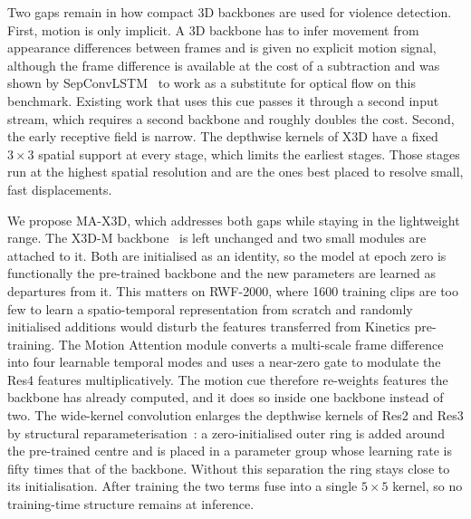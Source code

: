 \documentclass[conference]{IEEEtran}
\begin{document}
Two gaps remain in how compact 3D backbones are used for violence
detection. First, motion is only implicit. A 3D backbone has to infer
movement from appearance differences between frames and is given no
explicit motion signal, although the frame difference is available at
the cost of a subtraction and was shown by
SepConvLSTM~\cite{sepconvlstm} to work as a substitute for optical flow
on this benchmark. Existing work that uses this cue passes it through a
second input stream, which requires a second backbone and roughly
doubles the cost. Second, the early receptive field is narrow. The
depthwise kernels of X3D have a fixed $3\times3$ spatial support at
every stage, which limits the earliest stages. Those stages run at the
highest spatial resolution and are the ones best placed to resolve
small, fast displacements.

We propose MA-X3D, which addresses both gaps while staying in the
lightweight range. The X3D-M backbone~\cite{x3d} is left unchanged and
two small modules are attached to it. Both are initialised as an
identity, so the model at epoch zero is functionally the pre-trained
backbone and the new parameters are learned as departures from it. This
matters on RWF-2000, where 1600 training clips are too few to learn a
spatio-temporal representation from scratch and randomly initialised
additions would disturb the features transferred from Kinetics
pre-training. The Motion Attention module converts a multi-scale frame
difference into four learnable temporal modes and uses a near-zero gate
to modulate the Res4 features multiplicatively. The motion cue therefore
re-weights features the backbone has already computed, and it does so
inside one backbone instead of two. The wide-kernel convolution enlarges
the depthwise kernels of Res2 and Res3 by structural
reparameterisation~\cite{repvgg,acnet}: a zero-initialised outer ring is
added around the pre-trained centre and is placed in a parameter group
whose learning rate is fifty times that of the backbone. Without this
separation the ring stays close to its initialisation. After training
the two terms fuse into a single $5\times5$ kernel, so no training-time
structure remains at inference.
\end{document}
